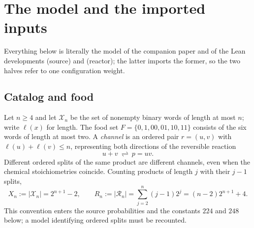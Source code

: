 \documentclass[11pt,letterpaper]{article}
\theoremstyle{plain}
\theoremstyle{definition}
\theoremstyle{remark}
\numberwithin{equation}{section}
\newcommand{\XX}{\mathcal X}
\newcommand{\RR}{\mathcal R}
\begin{document}
\section{The model and the imported inputs}\label{sec:model}

Everything below is literally the model of the companion paper \cite{companion2026} and of the Lean developments  (source) and  (reactor); the latter imports the former, so the two halves refer to one configuration weight.

\subsection{Catalog and food}
Let $n\ge4$ and let $\XX_n$ be the set of nonempty binary words of length at most $n$; write $\ell(x)$ for length. The food set $F=\{0,1,00,01,10,11\}$ consists of the six words of length at most two. A \emph{channel} is an ordered pair $r=(u,v)$ with $\ell(u)+\ell(v)\le n$, representing both directions of the reversible reaction
\[
 u+v\ \rightleftharpoons\ p=uv .
\]
Different ordered splits of the same product are different channels, even when the chemical stoichiometries coincide. Counting products of length $j$ with their $j-1$ splits,
\begin{equation}\label{eq:catalog}
 X_n:=|\XX_n|=2^{n+1}-2,\qquad
 R_n:=|\RR_n|=\sum_{j=2}^n(j-1)2^j=(n-2)2^{n+1}+4 .
\end{equation}
This convention enters the source probabilities and the constants $224$ and $248$ below; a model identifying ordered splits must be recounted.
\end{document}
